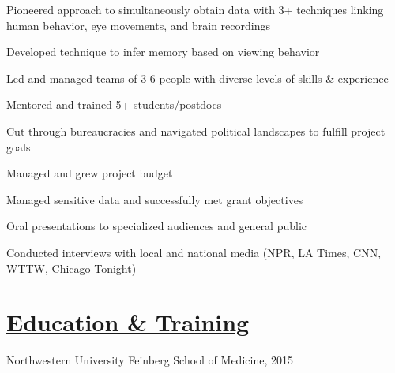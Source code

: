 \documentclass[]{winter-resume-openfont}
\begin{document}
\begin{minipage}[t]{0.65\textwidth}
\begin{tightemize}
\item Pioneered approach to simultaneously obtain data with 3+ techniques linking human behavior, eye movements, and brain recordings
\item Developed technique to infer memory based on viewing behavior
\end{tightemize}


\begin{tightemize}
\item Led and managed teams of 3-6 people with diverse levels of skills \& experience
\item Mentored and trained 5+ students/postdocs
\end{tightemize}


\begin{tightemize}
\item Cut through bureaucracies and navigated political landscapes to fulfill project goals
\item Managed and grew project budget 
\item Managed sensitive data and successfully met grant objectives
\end{tightemize}

\begin{tightemize}
\item Oral presentations to specialized audiences and general public
\item Conducted interviews with local and national media (NPR, LA Times, CNN, WTTW, Chicago Tonight)
\end{tightemize}

\sectionsep



\section{\underline{Education \& Training}}
\sectionsep


\begin{tightemize}
\item[] Northwestern University Feinberg School of Medicine, 2015
\end{tightemize}


\end{minipage}
\end{document}
